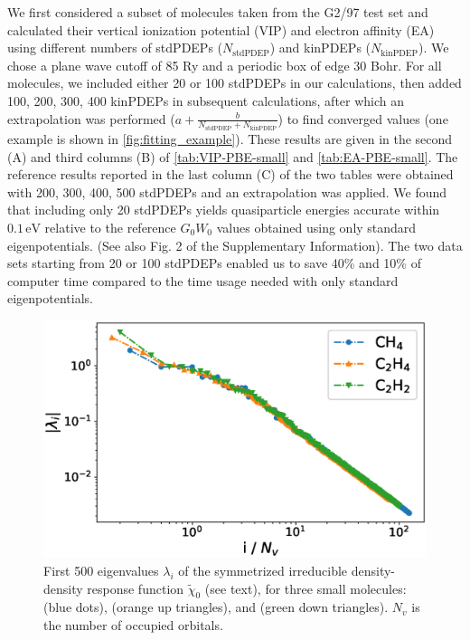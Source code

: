 \documentclass[aip,preprint]{revtex4-1}
\begin{document}
We first considered a subset of molecules taken from the G2/97 test set\cite{G2/97--testset} and calculated their vertical ionization potential (VIP) and electron affinity (EA) using different numbers of stdPDEPs ($N_\mathrm{stdPDEP}$) and kinPDEPs ($N_\mathrm{kinPDEP}$). We chose a plane wave cutoff of 85 Ry and a periodic box of edge 30 Bohr. For all molecules, we included either 20 or 100 stdPDEPs in our calculations, then added 100, 200, 300, 400 kinPDEPs in subsequent calculations, after which an extrapolation was performed ($a+\frac{b}{N_\mathrm{stdPDEP}+N_\mathrm{kinPDEP}}$) to find converged values (one example is shown in \autoref{fig:fitting_example}). These results are given in the second (A) and third columns (B) of \autoref{tab:VIP-PBE-small} and \autoref{tab:EA-PBE-small}. The reference results reported in the last column (C) of the two tables were obtained with 200, 300, 400, 500 stdPDEPs and an extrapolation was applied. We found that including only 20 stdPDEPs yields quasiparticle energies accurate within $0.1\,\mathrm{eV}$ relative to the reference $G_0W_0$ values obtained using only standard eigenpotentials. (See also Fig. 2 of the Supplementary Information). The two data sets starting from 20 or 100 stdPDEPs enabled us to save 40\% and 10\% of computer time compared to the time usage needed with only standard eigenpotentials.



\begin{figure}
    \centering
    \includegraphics[width=0.6\linewidth]{fig/eigenvals.eps}
    \caption{First 500 eigenvalues $\lambda_i$ of the symmetrized irreducible density-density response function $\tilde{\chi}_0$ (see text), for three small molecules:  (blue dots),  (orange up triangles), and  (green down triangles). $N_v$ is the number of occupied orbitals.}
    \label{fig:wstat-eigens}
\end{figure}
\end{document}
